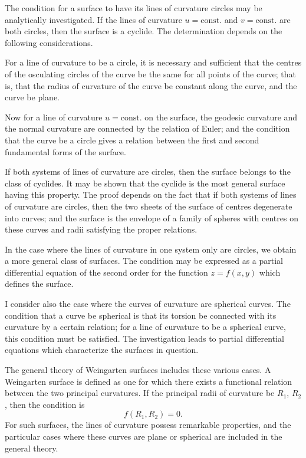 \documentclass[11pt,a4paper]{book}
\begin{document}
The condition for a surface to have its lines of curvature circles may be analytically investigated. If the lines of curvature $u = \text{const.}$ and $v = \text{const.}$ are both circles, then the surface is a cyclide. The determination depends on the following considerations.

For a line of curvature to be a circle, it is necessary and sufficient that the centres of the osculating circles of the curve be the same for all points of the curve; that is, that the radius of curvature of the curve be constant along the curve, and the curve be plane.

Now for a line of curvature $u = \text{const.}$ on the surface, the geodesic curvature and the normal curvature are connected by the relation of Euler; and the condition that the curve be a circle gives a relation between the first and second fundamental forms of the surface.

If both systems of lines of curvature are circles, then the surface belongs to the class of cyclides. It may be shown that the cyclide is the most general surface having this property. The proof depends on the fact that if both systems of lines of curvature are circles, then the two sheets of the surface of centres degenerate into curves; and the surface is the envelope of a family of spheres with centres on these curves and radii satisfying the proper relations.

In the case where the lines of curvature in one system only are circles, we obtain a more general class of surfaces. The condition may be expressed as a partial differential equation of the second order for the function $z = f(x,y)$ which defines the surface.

I consider also the case where the curves of curvature are spherical curves. The condition that a curve be spherical is that its torsion be connected with its curvature by a certain relation; for a line of curvature to be a spherical curve, this condition must be satisfied. The investigation leads to partial differential equations which characterize the surfaces in question.

The general theory of Weingarten surfaces includes these various cases. A Weingarten surface is defined as one for which there exists a functional relation between the two principal curvatures. If the principal radii of curvature be $R_1$, $R_2$, then the condition is
\[ f(R_1, R_2) = 0. \]
For such surfaces, the lines of curvature possess remarkable properties, and the particular cases where these curves are plane or spherical are included in the general theory.
\end{document}
